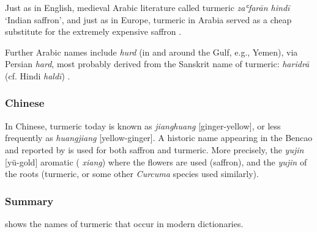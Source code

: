 Just as in English, medieval Arabic literature called turmeric \textit{zaʿfarān hindī} `Indian saffron', and just as in Europe, turmeric in Arabia served as a cheap substitute for the extremely expensive saffron \autocite{amar_arabian_2017}.


Further Arabic names include \textit{hurd} (in and around the Gulf, e.g., Yemen), via Persian \textit{hard}, most probably derived from the Sanskrit name of turmeric:  \textit{haridrā} (cf. Hindi  \textit{haldī}) \autocite{laufer_sino-iranica_1919}.



\subsubsection{Chinese}



In Chinese, turmeric today is known as \textit{jianghuang} [ginger-yellow], or less frequently as \textit{huangjiang} [yellow-ginger]. A historic name appearing in the \gls{Bencao} and reported by \textcite[312-313]{laufer_sino-iranica_1919} is used for both saffron and turmeric. More precisely, the \textit{yujin} [yü-gold] aromatic ( \textit{xiang}) where the flowers are used (saffron), and the \textit{yujin} of the roots (turmeric, or some other \textit{Curcuma} species used similarly).



\subsubsection{Summary}

 shows the names of turmeric that occur in modern dictionaries.



















